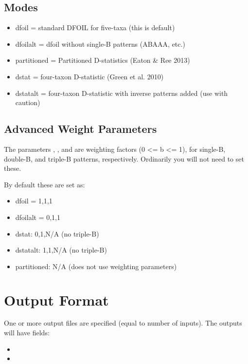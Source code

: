 \documentclass[letterpaper,12pt,english]{sphinxmanual}
\begin{document}
\subsection{Modes}
\label{\detokenize{intro:modes}}\begin{itemize}
\item {} 
dfoil = standard DFOIL for five-taxa (this is default)

\item {} 
dfoilalt = dfoil without single-B patterns (ABAAA, etc.)

\item {} 
partitioned = Partitioned D-statistics (Eaton \& Ree 2013)

\item {} 
dstat = four-taxon D-statistic (Green et al. 2010)

\item {} 
dstatalt = four-taxon D-statistic with inverse patterns added (use with caution)

\end{itemize}


\subsection{Advanced Weight Parameters}
\label{\detokenize{intro:advanced-weight-parameters}}
The parameters , , and  are weighting factors (0 \textless{}= b \textless{}= 1), for single-B, double-B, and triple-B patterns, respectively. Ordinarily you will not need to set these.

By default these are set as:
\begin{itemize}
\item {} 
dfoil = 1,1,1

\item {} 
dfoilalt = 0,1,1

\item {} 
dstat: 0,1,N/A (no triple-B)

\item {} 
dstatalt: 1,1,N/A (no triple-B)

\item {} 
partitioned: N/A (does not use weighting parameters)

\end{itemize}


\section{Output Format}
\label{\detokenize{intro:output-format}}
One or more output files are specified (equal to number of inputs).
The outputs will have fields:
\begin{itemize}
\item {} 

\item {} 

\end{itemize}
\end{document}
